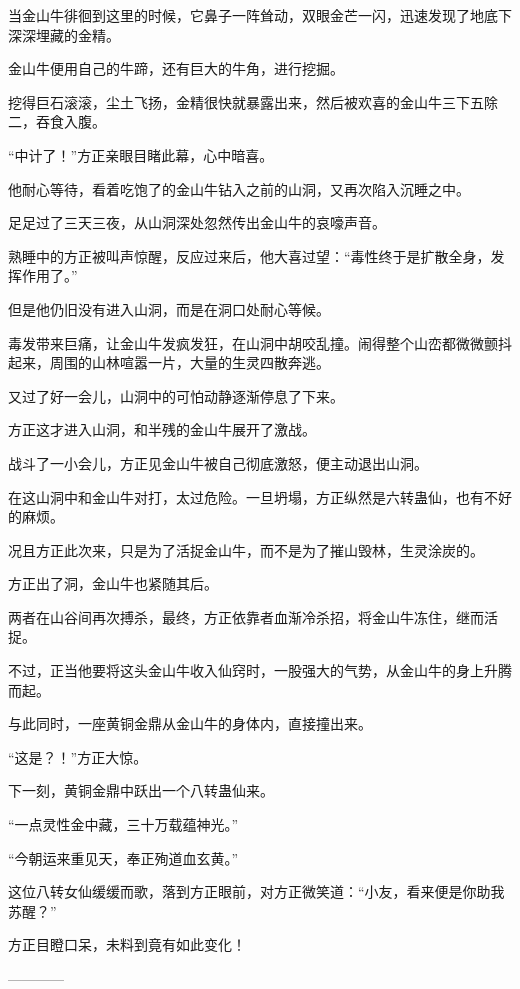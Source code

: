 \begin{this_body}
当金山牛徘徊到这里的时候，它鼻子一阵耸动，双眼金芒一闪，迅速发现了地底下深深埋藏的金精。

金山牛便用自己的牛蹄，还有巨大的牛角，进行挖掘。

挖得巨石滚滚，尘土飞扬，金精很快就暴露出来，然后被欢喜的金山牛三下五除二，吞食入腹。

“中计了！”方正亲眼目睹此幕，心中暗喜。

他耐心等待，看着吃饱了的金山牛钻入之前的山洞，又再次陷入沉睡之中。

足足过了三天三夜，从山洞深处忽然传出金山牛的哀嚎声音。

熟睡中的方正被叫声惊醒，反应过来后，他大喜过望：“毒性终于是扩散全身，发挥作用了。”

但是他仍旧没有进入山洞，而是在洞口处耐心等候。

毒发带来巨痛，让金山牛发疯发狂，在山洞中胡咬乱撞。闹得整个山峦都微微颤抖起来，周围的山林喧嚣一片，大量的生灵四散奔逃。

又过了好一会儿，山洞中的可怕动静逐渐停息了下来。

方正这才进入山洞，和半残的金山牛展开了激战。

战斗了一小会儿，方正见金山牛被自己彻底激怒，便主动退出山洞。

在这山洞中和金山牛对打，太过危险。一旦坍塌，方正纵然是六转蛊仙，也有不好的麻烦。

况且方正此次来，只是为了活捉金山牛，而不是为了摧山毁林，生灵涂炭的。

方正出了洞，金山牛也紧随其后。

两者在山谷间再次搏杀，最终，方正依靠者血渐冷杀招，将金山牛冻住，继而活捉。

不过，正当他要将这头金山牛收入仙窍时，一股强大的气势，从金山牛的身上升腾而起。

与此同时，一座黄铜金鼎从金山牛的身体内，直接撞出来。

“这是？！”方正大惊。

下一刻，黄铜金鼎中跃出一个八转蛊仙来。

“一点灵性金中藏，三十万载蕴神光。”

“今朝运来重见天，奉正殉道血玄黄。”

这位八转女仙缓缓而歌，落到方正眼前，对方正微笑道：“小友，看来便是你助我苏醒？”

方正目瞪口呆，未料到竟有如此变化！

------------

\end{this_body}

